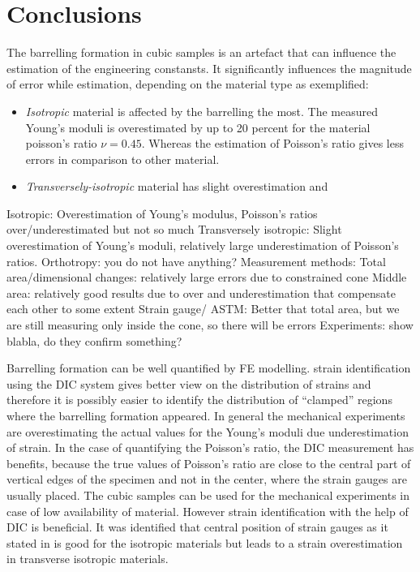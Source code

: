 \documentclass[review]{elsarticle}
\begin{document}
\section{Conclusions}

The barrelling formation in cubic samples is an artefact that can influence the
estimation of the engineering constansts. It significantly influences the
magnitude of error while estimation, depending on the material type as
exemplified:

\begin{itemize}
  \item \textit{Isotropic} material is affected by the barrelling the most.
  The measured Young's moduli is overestimated by up to 20 percent for the
  material poisson's ratio $\nu=0.45$. Whereas the estimation of Poisson's ratio
  gives less errors in comparison to other material.
  \item \textit{Transversely-isotropic} material has slight overestimation and
\end{itemize}


 Isotropic: Overestimation of Young's modulus, Poisson's ratios over/underestimated but not so much
Transversely isotropic: Slight overestimation of Young's moduli, relatively large underestimation of Poisson's ratios.
Orthotropy: you do not have anything?
Measurement methods:
Total area/dimensional changes: relatively large errors due to constrained cone
Middle area: relatively good results due to over and underestimation that compensate each other to some extent
Strain gauge/ ASTM: Better that total area, but we are still measuring only inside the cone, so there will be errors
Experiments: show blabla, do they confirm something?

Barrelling formation can be well quantified by  FE modelling. strain
identification using the DIC system gives better view on the distribution of
strains and therefore it is possibly easier to identify the distribution of
``clamped'' regions where the barrelling formation appeared. 
In general the mechanical experiments are overestimating the actual values for
the Young's moduli due underestimation of strain. In the case of quantifying the
Poisson's ratio, the DIC measurement has benefits, because the true values of Poisson's ratio are close
to the central part of vertical edges of the specimen and not in the center,
where the strain gauges are usually placed. 
The cubic samples can be used for the mechanical experiments in case of low
availability of material. However strain identification with the help of DIC is
beneficial. It was identified that central position of strain gauges as it
stated in is good for the isotropic materials but leads to a strain
overestimation in transverse isotropic materials. 
\end{document}
